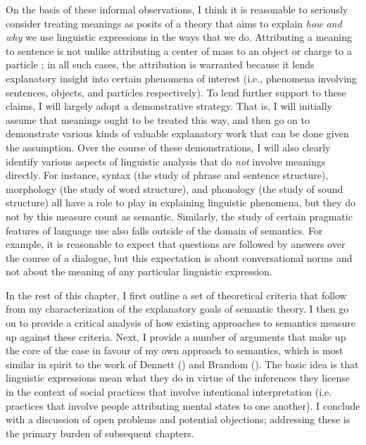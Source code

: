 On the basis of these informal observations, I think it is reasonable to seriously consider treating meanings as posits of a theory that aims to explain \textit{how and why} we use linguistic expressions in the ways that we do. Attributing a meaning to sentence is not unlike attributing a center of mass to an object or charge to a particle \citep[see][]{Dennett:1987}; in all such cases, the attribution is warranted because it lends explanatory insight into certain phenomena of interest (i.e., phenomena involving sentences, objects, and particles respectively). To lend further support to these claims, I will largely adopt a demonstrative strategy. That is, I will initially assume that meanings ought to be treated this way, and then go on to demonstrate various kinds of valuable explanatory work that can be done given the assumption. Over the course of these demonstrations, I will also clearly identify various aspects of linguistic analysis that do \textit{not} involve meanings directly. For instance, syntax (the study of phrase and sentence structure), morphology (the study of word structure), and phonology (the study of sound structure) all have a role to play in explaining linguistic phenomena, but they do not by this measure count as semantic. Similarly, the study of certain pragmatic features of language use also falls outside of the domain of semantics. For example, it is reasonable to expect that questions are followed by answers over the course of a dialogue, but this expectation is about conversational norms and not about the meaning of any particular linguistic expression.

In the rest of this chapter, I first outline a set of theoretical criteria that follow from my characterization of the explanatory goals of semantic theory. I then go on to provide a critical analysis of how existing approaches to semantics measure up against these criteria. Next, I provide a number of arguments that make up the core of the case in favour of my own approach to semantics, which is most similar in spirit to the work of Dennett (\citeyear{Dennett:1987,Dennett:1991}) and Brandom (\citeyear{Brandom:1994,Brandom:2009,Brandom:2000}). The basic idea is that linguistic expressions mean what they do in virtue of the inferences they license in the context of social practices that involve intentional interpretation (i.e. practices that involve people attributing mental states to one another). I conclude with a discussion of open problems and potential objections; addressing these is the primary burden of subsequent chapters.

